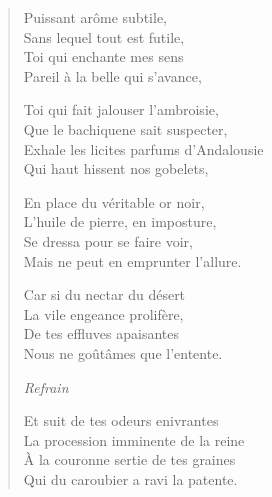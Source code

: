 \begin{verse}
Puissant arôme subtile,\\
Sans lequel tout est futile,\\
Toi qui enchante mes sens\\
Pareil à la belle qui s’avance,

Toi qui fait jalouser l’ambroisie,\\
Que le bachique ne sait suspecter,\\
Exhale les licites parfums d’Andalousie\\
Qui haut hissent nos gobelets,


En place du véritable or noir,\\
L’huile de pierre\label{foot.huiledepierre}, en imposture,\\
Se dressa pour se faire voir,\\
Mais ne peut en emprunter l’allure.

Car si du nectar du désert\\
La vile engeance prolifère,\\
De tes effluves apaisantes\\
Nous ne goûtâmes que l’entente.

\emph{Refrain}

Et suit de tes odeurs enivrantes\\
La procession imminente de la reine\\
À la couronne sertie de tes graines\\
Qui du caroubier a ravi la patente.


\end{verse}
